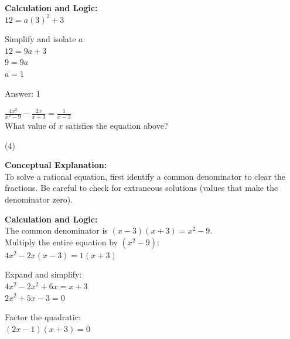 \documentclass[11pt,paper=a4,answers]{exam}
\begin{document}
\begin{questions}
\begin{solution}
\vspace{20pt}

\textbf{Calculation and Logic:} \\
$12 = a(3)^2 + 3$

\vspace{10pt}

Simplify and isolate $a$: \\
$12 = 9a + 3$ \\
$9 = 9a$ \\
$a = 1$

\vspace{25pt}

Answer: \colorbox{yellow!100}{1}
\end{solution}

\vspace{40pt}

\question
$\frac{4x^2}{x^2 - 9} - \frac{2x}{x + 3} = \frac{1}{x - 3}$ \\
What value of $x$ satisfies the equation above?
\begin{tasks}(4)
\end{tasks}

\begin{solution}
\textbf{Conceptual Explanation:} \\
To solve a rational equation, first identify a common denominator to clear the fractions. Be careful to check for extraneous solutions (values that make the denominator zero).

\vspace{20pt}

\textbf{Calculation and Logic:} \\
The common denominator is $(x - 3)(x + 3) = x^2 - 9$. \\
Multiply the entire equation by $(x^2 - 9)$: \\
$4x^2 - 2x(x - 3) = 1(x + 3)$

\vspace{10pt}

Expand and simplify: \\
$4x^2 - 2x^2 + 6x = x + 3$ \\
$2x^2 + 5x - 3 = 0$

\vspace{10pt}

Factor the quadratic: \\
$(2x - 1)(x + 3) = 0$


\end{solution}
\end{questions}
\end{document}
